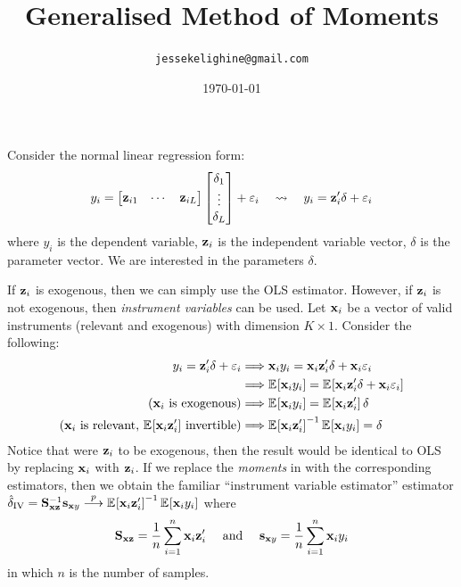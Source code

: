 \documentclass{article}
\title{Generalised Method of Moments}
\author{\texttt{jessekelighine@gmail.com}}
\date{\today}
\begin{document}
\maketitle

\noindent
Consider the normal linear regression form:
\begin{align}\label{true_model}
	y_i =
	\begin{bmatrix}
		\mathbf{z}_{i1} & \cdots & \mathbf{z}_{iL}
	\end{bmatrix}
	\begin{bmatrix}
		\delta_1\\\vdots\\\delta_L
	\end{bmatrix}
	+ \varepsilon_i
	\quad\leadsto\quad
	y_i = \mathbf{z}_i'\delta + \varepsilon_i
\end{align}
where
$y_i$ is the dependent variable,
$\mathbf{z}_i$ is the independent variable vector,
$\delta$ is the parameter vector.
We are interested in the parameters $\delta$.

If $\mathbf{z}_i$ is exogenous, then we can simply use the OLS estimator.
However, if $\mathbf{z}_i$ is not exogenous,
then \emph{instrument variables} can be used.
Let $\mathbf{x}_i$ be a vector of valid instruments (relevant and exogenous) with dimension $K\times1$.
Consider the following:
\begin{align}
	y_i = \mathbf{z}_i'\delta + \varepsilon_i
	&\Longrightarrow \mathbf{x}_i y_i = \mathbf{x}_i \mathbf{z}_i' \delta + \mathbf{x}_i \varepsilon_i \\
	&\Longrightarrow \operatorname{\mathbb{E}}_{}\!\left[\mathbf{x}_i y_i\right] = \operatorname{\mathbb{E}}_{}\!\left[\mathbf{x}_i \mathbf{z}_i' \delta + \mathbf{x}_i \varepsilon_i\right] \\
	\text{($\mathbf{x}_i$ is exogenous)}
	&\Longrightarrow \operatorname{\mathbb{E}}_{}\!\left[\mathbf{x}_i y_i\right] = \operatorname{\mathbb{E}}_{}\!\left[\mathbf{x}_i \mathbf{z}_i'\right]\delta \label{motif} \\
	\text{($\mathbf{x}_i$ is relevant, $\operatorname{\mathbb{E}}_{}\!\left[\mathbf{x}_i\mathbf{z}_i'\right]$ invertible)}
	&\Longrightarrow \operatorname{\mathbb{E}}_{}\!\left[\mathbf{x}_i\mathbf{z}_i'\right]^{-1}\operatorname{\mathbb{E}}_{}\!\left[\mathbf{x}_i y_i\right] = \delta \label{IV}
\end{align}
Notice that were $\mathbf{z}_i$ to be exogenous,
then the result would be identical to OLS by replacing $\mathbf{x}_i$ with $\mathbf{z}_i$.
If we replace the \emph{moments} in  with the corresponding estimators,
then we obtain the familiar ``instrument variable estimator''
estimator $\hat\delta_{\text{IV}}=\mathbf{S}_{\mathbf{x}\mathbf{z}}^{-1}\mathbf{s}_{\mathbf{x} y}\overset{p}{\longrightarrow}\operatorname{\mathbb{E}}_{}\!\left[\mathbf{x}_i\mathbf{z}_i'\right]^{-1}\operatorname{\mathbb{E}}_{}\!\left[\mathbf{x}_i y_i\right]$ where
\begin{align*}
	\mathbf{S}_{\mathbf{x}\mathbf{z}} = \frac1n\sum_{i=1}^{n} \mathbf{x}_i\mathbf{z}_i' \quad\text{ and }\quad
	\mathbf{s}_{\mathbf{x} y} = \frac1n\sum_{i=1}^{n} \mathbf{x}_iy_i
\end{align*}
in which $n$ is the number of samples.
\end{document}
